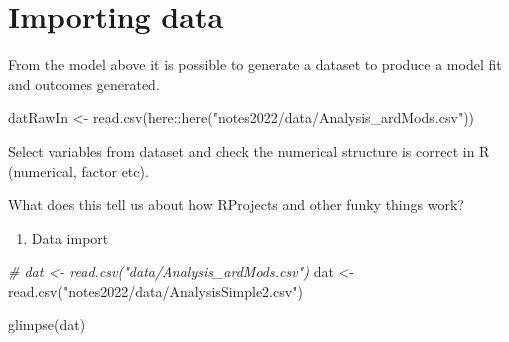 \documentclass[
]{book}
\newenvironment{Shaded}{\begin{snugshade}}{\end{snugshade}}
\newcommand{\AttributeTok}[1]{\textcolor[rgb]{0.77,0.63,0.00}{#1}}
\newcommand{\CommentTok}[1]{\textcolor[rgb]{0.56,0.35,0.01}{\textit{#1}}}
\newcommand{\DecValTok}[1]{\textcolor[rgb]{0.00,0.00,0.81}{#1}}
\newcommand{\FunctionTok}[1]{\textcolor[rgb]{0.00,0.00,0.00}{#1}}
\newcommand{\NormalTok}[1]{#1}
\newcommand{\OtherTok}[1]{\textcolor[rgb]{0.56,0.35,0.01}{#1}}
\newcommand{\SpecialCharTok}[1]{\textcolor[rgb]{0.00,0.00,0.00}{#1}}
\newcommand{\StringTok}[1]{\textcolor[rgb]{0.31,0.60,0.02}{#1}}
\providecommand{\tightlist}{%
  \setlength{\itemsep}{0pt}\setlength{\parskip}{0pt}}
\begin{document}
\hypertarget{importing-data}{%
\section{Importing data}\label{importing-data}}

From the model above it is possible to generate a dataset to produce a model fit and outcomes generated.

\begin{Shaded}
\begin{Highlighting}[]
\NormalTok{datRawIn }\OtherTok{\textless{}{-}} \FunctionTok{read.csv}\NormalTok{(here}\SpecialCharTok{::}\FunctionTok{here}\NormalTok{(}\StringTok{"notes2022/data/Analysis\_ardMods.csv"}\NormalTok{))}
\end{Highlighting}
\end{Shaded}

Select variables from dataset and check the numerical structure is correct in R (numerical, factor etc).

\begin{Shaded}
\end{Shaded}

What does this tell us about how RProjects and other funky things work?

\begin{enumerate}
\def\labelenumi{\arabic{enumi}.}
\setcounter{enumi}{2}
\tightlist
\item
  Data import
\end{enumerate}

\begin{Shaded}
\begin{Highlighting}[]
\CommentTok{\# dat \textless{}{-} read.csv("data/Analysis\_ardMods.csv")}
\NormalTok{dat }\OtherTok{\textless{}{-}} \FunctionTok{read.csv}\NormalTok{(}\StringTok{"notes2022/data/AnalysisSimple2.csv"}\NormalTok{)}

\FunctionTok{glimpse}\NormalTok{(dat)}
\end{Highlighting}
\end{Shaded}
\end{document}
